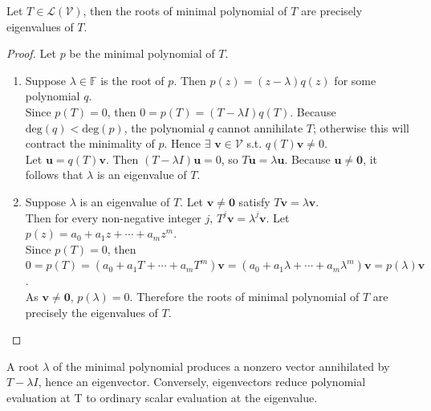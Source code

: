 \begin{theorem} \label{thm:minimalpolyiseigenvalues} Let $T \in \mathcal{L}(\mathcal{V})$, then the roots of minimal polynomial of $T$ are precisely eigenvalues of $T$.
\begin{proof} Let $p$ be the minimal polynomial of $T$.
\begin{enumerate}[label=\roman*.]
\setlength{\itemsep}{0pt}
\item[$(\Rightarrow)$] Suppose $\lambda \in \mathbb{F}$ is the root of $p$. Then $p(z) = (z - \lambda) q(z)$ for some polynomial $q$.\\
Since $p(T) = 0$, then $0 = p(T) = (T - \lambda I) q(T)$. Because $\text{deg}(q) < \text{deg}(p)$, the polynomial $q$ cannot annihilate $T$; otherwise this will contract the minimality of $p$. Hence $\exists$ $\mathbf{v} \in \mathcal{V}$ s.t. $q(T) \mathbf{v} \neq 0$.\\
Let $\mathbf{u} = q(T)\mathbf{v}$. Then $(T - \lambda I)\mathbf{u} = 0$, so $T \mathbf{u} = \lambda \mathbf{u}$. Because $\mathbf{u} \neq \mathbf{0}$, it follows that $\lambda$ is an eigenvalue of $T$.
\item[$(\Leftarrow)$] Suppose $\lambda$ is an eigenvalue of $T$. Let $\mathbf{v} \neq \mathbf{0}$ satisfy $T \mathbf{v} = \lambda \mathbf{v}$.\\
Then for every non-negative integer $j$, $T^j \mathbf{v} = \lambda^j \mathbf{v}$. Let $p(z) = a_0 + a_1 z + \cdots + a_m z^m$.\\
Since $p(T) = 0$, then $0 = p(T) = (a_0 + a_1 T + \cdots + a_m T^m)\mathbf{v} = (a_0 + a_1 \lambda + \cdots + a_m \lambda^m)\mathbf{v} = p(\lambda) \mathbf{v}$.\\
As $\mathbf{v} \neq \mathbf{0}$, $p(\lambda) = 0$. Therefore the roots of minimal polynomial of $T$ are precisely the eigenvalues of $T$.
\end{enumerate}
\end{proof}
\end{theorem}

A root $\lambda$ of the minimal polynomial produces a nonzero vector annihilated by $T - \lambda I$, hence an eigenvector. Conversely, eigenvectors reduce polynomial evaluation at T to ordinary scalar evaluation at the eigenvalue.

